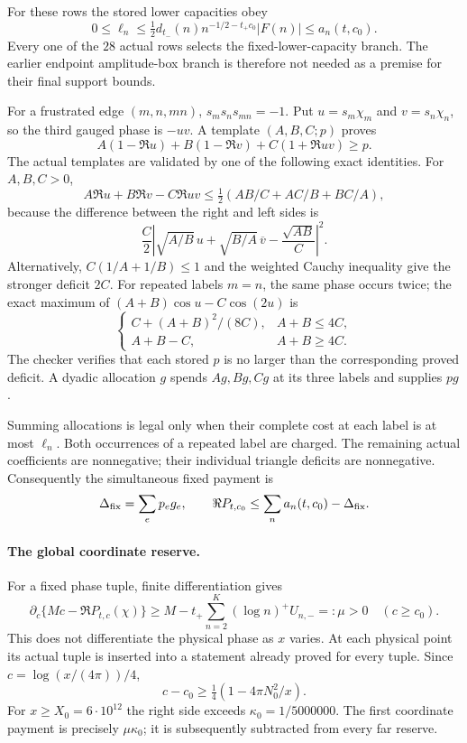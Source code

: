 \documentclass[11pt,a4paper]{article}
\theoremstyle{definition}
\theoremstyle{remark}
\begin{document}
For these rows the stored lower capacities obey
\[
 0\le\ell_n\le
 \tfrac12d_{t_-}(n)n^{-1/2-t_+c_0}|F(n)|
 \le a_n(t,c_0).
\]
Every one of the $28$ actual rows selects the fixed-lower-capacity
branch. The earlier endpoint amplitude-box branch is therefore not
needed as a premise for their final support bounds.

For a frustrated edge $(m,n,mn)$, $s_ms_ns_{mn}=-1$. Put
$u=s_m\chi_m$ and $v=s_n\chi_n$, so the third gauged phase is $-uv$.
A template $(A,B,C;p)$ proves
\begin{equation}
 A(1-\Re u)+B(1-\Re v)+C(1+\Re uv)\ge p.
 \label{eq:credit-triad-deficit}
\end{equation}
The actual templates are validated by one of the following exact
identities. For $A,B,C>0$,
\[
 A\Re u+B\Re v-C\Re uv
 \le\tfrac12(AB/C+AC/B+BC/A),
\]
because the difference between the right and left sides is
\[
 \frac C2\left|\sqrt{A/B}\,u+\sqrt{B/A}\,\overline v
                         -\frac{\sqrt{AB}}C\right|^2.
\]
Alternatively, $C(1/A+1/B)\le1$ and the weighted Cauchy inequality
give the stronger deficit $2C$. For repeated labels $m=n$, the same
phase occurs twice; the exact maximum of
$(A+B)\cos u-C\cos(2u)$ is
\[
 \begin{cases}
 C+(A+B)^2/(8C),&A+B\le4C,\\
 A+B-C,&A+B\ge4C.
 \end{cases}
\]
The checker verifies that each stored $p$ is no larger than the
corresponding proved deficit. A dyadic allocation $g$ spends
$Ag,Bg,Cg$ at its three labels and supplies $pg$.

Summing allocations is legal only when their complete cost at each
label is at most $\ell_n$. Both occurrences of a repeated label are
charged. The remaining actual coefficients are nonnegative; their
individual triangle deficits are nonnegative. Consequently the
simultaneous fixed payment is
\[
 \Delta_{\rm fix}=\sum_e p_eg_e,
 \qquad \Re P_{t,c_0}\le\sum_n a_n(t,c_0)-\Delta_{\rm fix}.
\]

\paragraph{The global coordinate reserve.}
For a fixed phase tuple, finite differentiation gives
\[
 \partial_c\{Mc-\Re P_{t,c}(\chi)\}
 \ge M-t_+\sum_{n=2}^{K}(\log n)^+U_{n,-}=:\mu>0
 \quad(c\ge c_0).
\]
This does not differentiate the physical phase as $x$ varies. At each
physical point its actual tuple is inserted into a statement already
proved for every tuple. Since $c=\log(x/(4\pi))/4$,
\[
 c-c_0\ge\tfrac14(1-4\pi N_0^2/x).
\]
For $x\ge X_0=6\cdot10^{12}$ the right side exceeds
$\kappa_0=1/5000000$. The first coordinate payment is precisely
$\mu\kappa_0$; it is subsequently subtracted from every far reserve.
\end{document}

